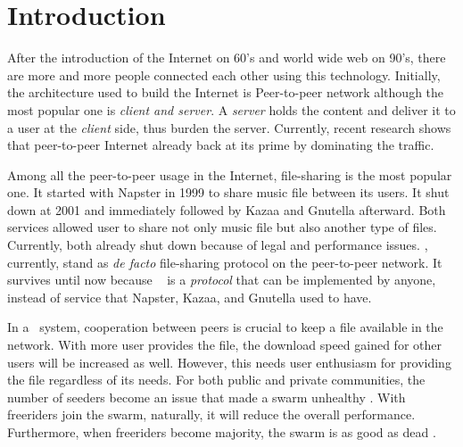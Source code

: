 \chapter{Introduction}
\label{chp:introduction}


%
%
%
%
%
After the introduction of the Internet on 60's and world wide web on 90's, there are more and more people connected each other using this technology. Initially, the architecture used to build the Internet is Peer-to-peer network although the most popular one is \textit{client and server}. A \textit{server} holds the content and deliver it to a user at the \textit{client} side, thus burden the server. Currently, recent research shows that peer-to-peer Internet already back at its prime by dominating the traffic\cite{2015:internettraffic:sandvine}.

Among all the peer-to-peer usage in the Internet, file-sharing is the most popular one. It started with Napster in 1999 to share music file between its users. It shut down at 2001 and immediately followed by Kazaa and Gnutella afterward. Both services allowed user to share not only music file but also another type of files. Currently, both already shut down because of legal and performance issues. \bt, currently, stand as \textit{de facto} file-sharing protocol on the peer-to-peer network. It survives until now because \bt~ is a \textit{protocol} that can be implemented by anyone, instead of service that Napster, Kazaa, and Gnutella used to have.

In a \bt~system, cooperation between peers is crucial to keep a file available in the network. With more user provides the file, the download speed gained for other users will be increased as well. However, this needs user enthusiasm for providing the file regardless of its needs. For both public and private communities, the number of seeders become an issue that made a swarm unhealthy \cite{2010:pubpriv:meulpolder, 2014:sustainabilitytorrent:chen}. With freeriders join the swarm, naturally, it will reduce the overall performance. Furthermore, when freeriders become majority, the swarm is as good as dead \cite{2000:freeridegnutella:adar}. 

